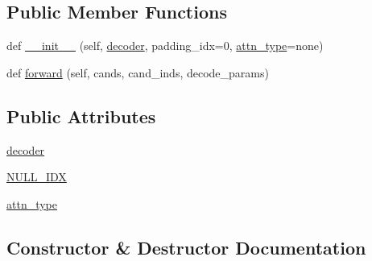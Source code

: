 \subsection*{Public Member Functions}
\begin{DoxyCompactItemize}
\item 
def \hyperlink{classparlai_1_1agents_1_1legacy__agents_1_1seq2seq_1_1modules__v0_1_1Ranker_a79693c86fc7bebea2b197e1c168ec002}{\+\_\+\+\_\+init\+\_\+\+\_\+} (self, \hyperlink{classparlai_1_1agents_1_1legacy__agents_1_1seq2seq_1_1modules__v0_1_1Ranker_a5500f3bd094b3a3b19c992cbc1d42918}{decoder}, padding\+\_\+idx=0, \hyperlink{classparlai_1_1agents_1_1legacy__agents_1_1seq2seq_1_1modules__v0_1_1Ranker_a17f285352bdb89eea215c874a38bee02}{attn\+\_\+type}=\textquotesingle{}none\textquotesingle{})
\item 
def \hyperlink{classparlai_1_1agents_1_1legacy__agents_1_1seq2seq_1_1modules__v0_1_1Ranker_a48177b131d765ebd734d25f962c44f55}{forward} (self, cands, cand\+\_\+inds, decode\+\_\+params)
\end{DoxyCompactItemize}
\subsection*{Public Attributes}
\begin{DoxyCompactItemize}
\item 
\hyperlink{classparlai_1_1agents_1_1legacy__agents_1_1seq2seq_1_1modules__v0_1_1Ranker_a5500f3bd094b3a3b19c992cbc1d42918}{decoder}
\item 
\hyperlink{classparlai_1_1agents_1_1legacy__agents_1_1seq2seq_1_1modules__v0_1_1Ranker_a17d8139e8d7e9952f0f17e8884710744}{N\+U\+L\+L\+\_\+\+I\+DX}
\item 
\hyperlink{classparlai_1_1agents_1_1legacy__agents_1_1seq2seq_1_1modules__v0_1_1Ranker_a17f285352bdb89eea215c874a38bee02}{attn\+\_\+type}
\end{DoxyCompactItemize}


\subsection{Constructor \& Destructor Documentation}
\mbox{\label{classparlai_1_1agents_1_1legacy__agents_1_1seq2seq_1_1modules__v0_1_1Ranker_a79693c86fc7bebea2b197e1c168ec002}} 
